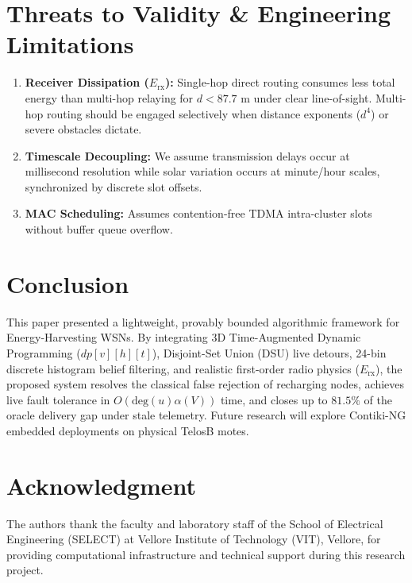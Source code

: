 \documentclass[conference]{IEEEtran}
\begin{document}
\section{Threats to Validity \& Engineering Limitations}
\begin{enumerate}
    \item \textbf{Receiver Dissipation ($E_{\text{rx}}$):} Single-hop direct routing consumes less total energy than multi-hop relaying for $d < 87.7\text{ m}$ under clear line-of-sight. Multi-hop routing should be engaged selectively when distance exponents ($d^4$) or severe obstacles dictate.
    \item \textbf{Timescale Decoupling:} We assume transmission delays occur at millisecond resolution while solar variation occurs at minute/hour scales, synchronized by discrete slot offsets.
    \item \textbf{MAC Scheduling:} Assumes contention-free TDMA intra-cluster slots without buffer queue overflow.
\end{enumerate}

\section{Conclusion}
This paper presented a lightweight, provably bounded algorithmic framework for Energy-Harvesting WSNs. By integrating 3D Time-Augmented Dynamic Programming ($dp[v][h][t]$), Disjoint-Set Union (DSU) live detours, 24-bin discrete histogram belief filtering, and realistic first-order radio physics ($E_{\text{rx}}$), the proposed system resolves the classical false rejection of recharging nodes, achieves live fault tolerance in $O(\text{deg}(u)\alpha(V))$ time, and closes up to $81.5\%$ of the oracle delivery gap under stale telemetry. Future research will explore Contiki-NG embedded deployments on physical TelosB motes.

\section*{Acknowledgment}
The authors thank the faculty and laboratory staff of the School of Electrical Engineering (SELECT) at Vellore Institute of Technology (VIT), Vellore, for providing computational infrastructure and technical support during this research project.
\end{document}
